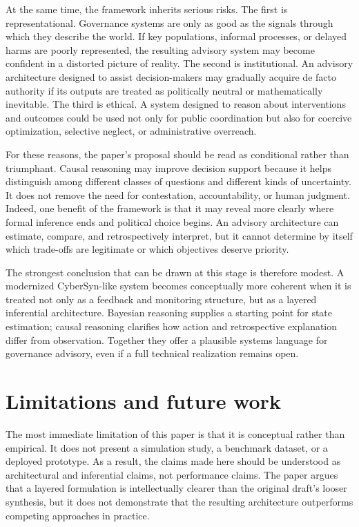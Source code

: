 \documentclass[11pt]{article}
\begin{document}
At the same time, the framework inherits serious risks. The first is representational. Governance systems are only as good as the signals through which they describe the world. If key populations, informal processes, or delayed harms are poorly represented, the resulting advisory system may become confident in a distorted picture of reality. The second is institutional. An advisory architecture designed to assist decision-makers may gradually acquire de facto authority if its outputs are treated as politically neutral or mathematically inevitable. The third is ethical. A system designed to reason about interventions and outcomes could be used not only for public coordination but also for coercive optimization, selective neglect, or administrative overreach.

For these reasons, the paper's proposal should be read as conditional rather than triumphant. Causal reasoning may improve decision support because it helps distinguish among different classes of questions and different kinds of uncertainty. It does not remove the need for contestation, accountability, or human judgment. Indeed, one benefit of the framework is that it may reveal more clearly where formal inference ends and political choice begins. An advisory architecture can estimate, compare, and retrospectively interpret, but it cannot determine by itself which trade-offs are legitimate or which objectives deserve priority.

The strongest conclusion that can be drawn at this stage is therefore modest. A modernized CyberSyn-like system becomes conceptually more coherent when it is treated not only as a feedback and monitoring structure, but as a layered inferential architecture. Bayesian reasoning supplies a starting point for state estimation; causal reasoning clarifies how action and retrospective explanation differ from observation. Together they offer a plausible systems language for governance advisory, even if a full technical realization remains open.

\section{Limitations and future work}

The most immediate limitation of this paper is that it is conceptual rather than empirical. It does not present a simulation study, a benchmark dataset, or a deployed prototype. As a result, the claims made here should be understood as architectural and inferential claims, not performance claims. The paper argues that a layered formulation is intellectually clearer than the original draft's looser synthesis, but it does not demonstrate that the resulting architecture outperforms competing approaches in practice.
\end{document}
